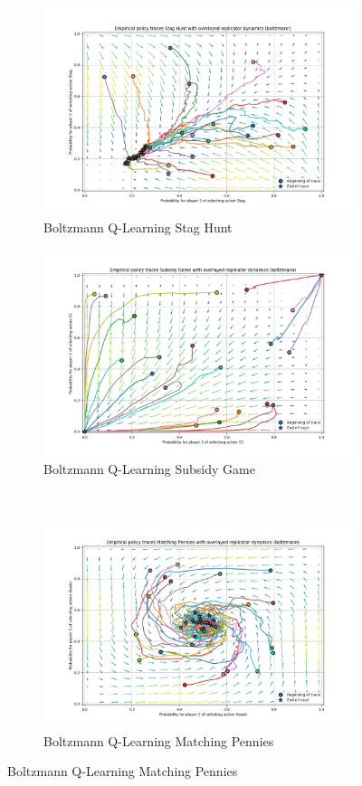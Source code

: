 \documentclass[12pt,letterpaper, onecolumn]{exam}
\begin{document}
\begin{figure}
    \begin{subfigure}{.5\textwidth}
      \centering
      \includegraphics[width=.6\linewidth]{plots/replicator_trajectoreis_Stag Hunt_boltzmann.png}
      \caption{Boltzmann Q-Learning Stag Hunt}
      \label{fig:sfigbsh}
    \end{subfigure}%
    \begin{subfigure}{.5\textwidth}
      \centering
      \includegraphics[width=.6\linewidth]{plots/replicator_trajectoreis_Subsidy Game_boltzmann.png}
      \caption{Boltzmann Q-Learning Subsidy Game}
      \label{fig:sfigbsg}
    \end{subfigure}\\
    \begin{subfigure}{.5\textwidth}
      \centering
      \includegraphics[width=.6\linewidth]{plots/replicator_trajectoreis_Matching Pennies_boltzmann.png}
      \caption{Boltzmann Q-Learning Matching Pennies}

\end{subfigure}
\end{figure}
\end{document}
